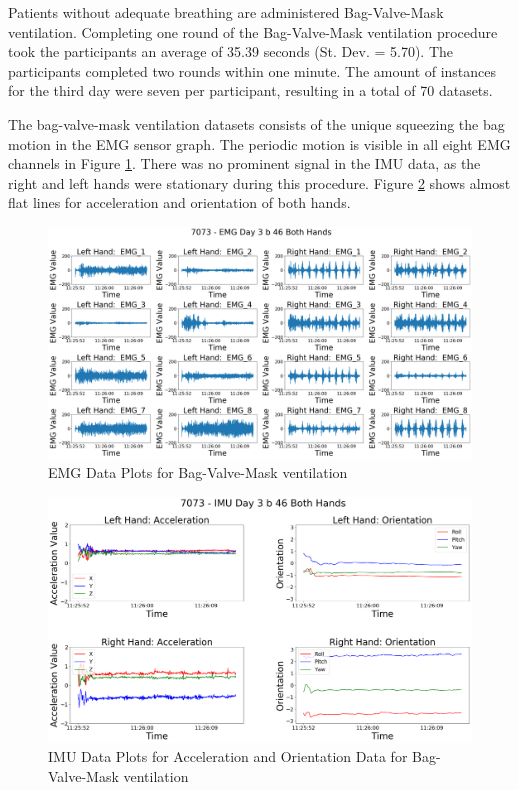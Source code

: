 Patients without adequate breathing are administered Bag-Valve-Mask ventilation. Completing one round of the Bag-Valve-Mask ventilation procedure took the participants an average of 35.39 seconds (St. Dev. = 5.70). The participants completed two rounds within one minute. The amount of instances for the third day were seven per participant, resulting in a total of 70 datasets.
\par The bag-valve-mask ventilation datasets consists of the unique squeezing the bag motion in the EMG sensor graph. The periodic motion is visible in all eight EMG channels in Figure \ref{fig:7073emgday3b46}. There was no prominent signal in the IMU data, as the right and left hands were stationary during this procedure. Figure \ref{fig:7073imuday3b46} shows almost flat lines for acceleration and orientation of both hands.
\begin{figure}[!h]
	\centering
	\includegraphics[width=\linewidth]{pictures/7073_EMG_Day3_b_46}
	\caption{EMG Data Plots for Bag-Valve-Mask ventilation}
	\label{fig:7073emgday3b46}
\end{figure}
\begin{figure}[!h]
	\centering
	\includegraphics[width=\linewidth]{pictures/7073_IMU_Day3_b_46}
	\caption{IMU Data Plots for Acceleration and Orientation Data for Bag-Valve-Mask ventilation}
	\label{fig:7073imuday3b46}
\end{figure}

